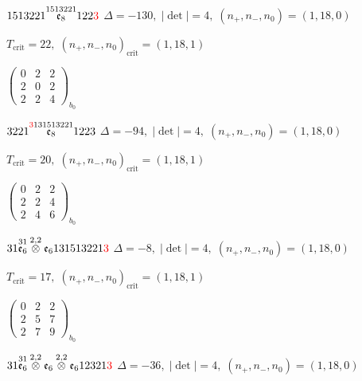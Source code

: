 \documentclass[10pt]{article}
\begin{document}
$1513221\overset{1513221}{\mathfrak{e}_8}122\textcolor{red}{3}$ \quad $\Delta=-130,\; |\det|=4,\; (n_+,n_-,n_0)=(1,18,0)$

\hspace{1em}$T_{\text{crit}}=22,\; (n_+,n_-,n_0)_{\text{crit}}=(1,18,1)$

\hspace{2em}$\left(\begin{smallmatrix}0 & 2 & 2 \\ 2 & 0 & 2 \\ 2 & 2 & 4\end{smallmatrix}\right)_{\!b_0}$

\smallskip

$3221\overset{\textcolor{red}{3}131513221}{\mathfrak{e}_8}1223$ \quad $\Delta=-94,\; |\det|=4,\; (n_+,n_-,n_0)=(1,18,0)$

\hspace{1em}$T_{\text{crit}}=20,\; (n_+,n_-,n_0)_{\text{crit}}=(1,18,1)$

\hspace{2em}$\left(\begin{smallmatrix}0 & 2 & 2 \\ 2 & 2 & 4 \\ 2 & 4 & 6\end{smallmatrix}\right)_{\!b_0}$

\smallskip

$31\overset{31}{\mathfrak{e}_6}\overset{2,2}{\otimes}\mathfrak{e}_6131513221\textcolor{red}{3}$ \quad $\Delta=-8,\; |\det|=4,\; (n_+,n_-,n_0)=(1,18,0)$

\hspace{1em}$T_{\text{crit}}=17,\; (n_+,n_-,n_0)_{\text{crit}}=(1,18,1)$

\hspace{2em}$\left(\begin{smallmatrix}0 & 2 & 2 \\ 2 & 5 & 7 \\ 2 & 7 & 9\end{smallmatrix}\right)_{\!b_0}$

\smallskip

$31\overset{31}{\mathfrak{e}_6}\overset{2,2}{\otimes}\mathfrak{e}_6\overset{2,2}{\otimes}\mathfrak{e}_612321\textcolor{red}{3}$ \quad $\Delta=-36,\; |\det|=4,\; (n_+,n_-,n_0)=(1,18,0)$
\end{document}
